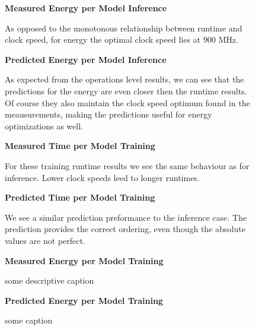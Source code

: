 \begin{figure}[htbp]
    \centering
    \parbox{1.1\textwidth}{\centering\textbf{Measured Energy per Model Inference}}
    \caption{As opposed to the monotonous relationship between runtime and clock speed, for energy the optimal clock speed lies at $900$ MHz.}
    \label{fig:grpfmenergyinf}
    \vspace{0.2cm}
    \parbox{1.1\textwidth}{\centering\textbf{Predicted Energy per Model Inference}}
    \caption{As expected from the operations level results, we can see that the predictions for the energy are even closer then the runtime results. Of course they also maintain the clock speed optimum found in the meausurements, making the predictions useful for energy optimizations as well.}
    \label{fig:fprpredenergyinf}
\end{figure}


\begin{figure}[htbp]
    \centering
    \parbox{1.1\textwidth}{\centering\textbf{Measured Time per Model Training}}
    \caption{For these training runtime results we see the same behaviour as for inference. Lower clock speeds leed to longer runtimes.}
    \label{fig:grpfmtimetrain}
    \vspace{0.2cm}
    \parbox{1.1\textwidth}{\centering\textbf{Predicted Time per Model Training}}
    \caption{We see a similar prediction preformance to the inference case. The prediction provides the correct ordering, even though the absolute values are not perfect.}
    \label{fig:grppredtimetrain}
\end{figure}


\begin{figure}[htbp]
    \centering
    \parbox{1.1\textwidth}{\centering\textbf{Measured Energy per Model Training}}
    \caption{some descriptive caption}
    \label{fig:grpfmenergytrain}
    \vspace{0.2cm}
    \parbox{1.1\textwidth}{\centering\textbf{Predicted Energy per Model Training}}
    \caption{some caption}
    \label{fig:grppredenergytrain}
\end{figure}



